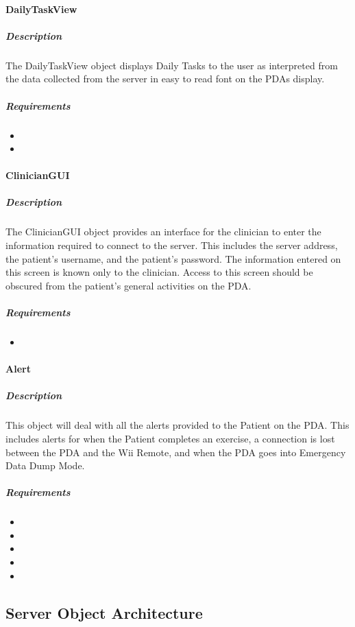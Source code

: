 \documentclass{article}
\begin{document}
\paragraph{DailyTaskView}
\subparagraph{Description}
The DailyTaskView object displays Daily Tasks to the user as interpreted from the data collected from the server in easy to read font on the PDAs display.
\subparagraph{Requirements}
\begin{itemize}
\item {}
\item {}
\end{itemize}
\paragraph{ClinicianGUI}
\subparagraph{Description}
The ClinicianGUI object provides an interface for the clinician to enter the information required to connect to the server. This includes the server address, the patient's username, and the patient's password. The information entered on this screen is known only to the clinician. Access to this screen should be obscured from the patient's general activities on the PDA.
\subparagraph{Requirements}
\begin{itemize}
\item {}
\end{itemize}
\paragraph{Alert}
\subparagraph{Description}
This object will deal with all the alerts provided to the Patient on the PDA. This includes alerts for when the Patient completes an exercise, a connection is lost between the PDA and the Wii Remote, and when the PDA goes into Emergency Data Dump Mode. 
\subparagraph{Requirements}
\begin{itemize}
\item {}
\item {}
\item {}
\item {}
\item {}
\end{itemize}

\newpage
\subsection{Server Object Architecture}
\end{document}
